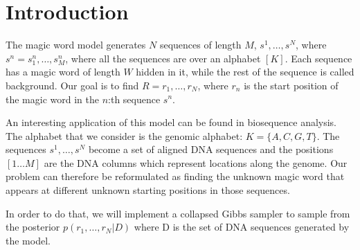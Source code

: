 
\chapter{Introduction} %

\label{Intoduction} %



The magic word model generates $N$ sequences of length $M$, $s^1,\dots,s^N$, where $s^n = s_1^n,\dots, s_M^n$, where all the sequences are over an alphabet $[K].$ Each sequence has a magic word of length $W$ hidden in it, while the rest of the sequence is called background. Our goal is to find $R=r_1, \dots,r_N$, where $r_n$ is the start position of the magic word in the $n$:th sequence $s^n$.

An interesting application of this model can be found in biosequence analysis. The alphabet that we consider is the genomic alphabet: $K = \{ A, C, G, T\}$. The sequences $s^1,\dots,s^N$ become a set of aligned DNA sequences and the positions $[1\dots M]$ are the DNA columns which represent locations along the genome. Our problem can therefore be  reformulated as finding the unknown magic word that appears at different unknown starting positions in those sequences. 

In order to do that, we will implement a collapsed Gibbs sampler to sample from the posterior $p(r_1, \dots, r_N|D)$ where D is the set of DNA sequences generated by the model.
